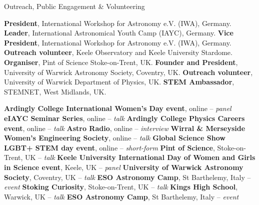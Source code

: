 \begin{rubric}{Outreach, Public Engagement \& Volunteering }

\entry*[2023 -- 2024]%
    \textbf{President}, International Workshop for Astronomy e.V. (IWA), Germany.
\entry*[2017 -- 2024]%
    \textbf{Leader}, International Astronomical Youth Camp (IAYC), Germany. 
\entry*[2021 -- 2023]%
    \textbf{Vice President}, International Workshop for Astronomy e.V. (IWA), Germany. 
\entry*[2019 -- 2022]%
    \textbf{Outreach volunteer}, Keele Observatory and Keele University Stardome.
\entry*[2019 -- 2020]%
    \textbf{Organiser}, Pint of Science Stoke-on-Trent, UK.
\entry*[2016 -- 2018]%
    \textbf{Founder and President}, University of Warwick Astronomy Society, Coventry, UK.
\entry*[2017 -- 2018]%
    \textbf{Outreach volunteer}, University of Warwick Department of Physics, UK. 
\entry*[2016 -- 2018]%
    \textbf{STEM Ambassador}, STEMNET, West Midlands, UK.

\entry*[2022]%
    \textbf{Ardingly College International Women's Day event}, online -- \textit{panel}
\entry*[2021]%
    \textbf{eIAYC Seminar Series}, online -- \textit{talk}
\entry*[2021]%
    \textbf{Ardingly College Physics Careers event}, online -- \textit{talk}
\entry*[2021]%
    \textbf{Astro Radio}, online -- \textit{interview}
\entry*[2020]%
    \textbf{Wirral \& Merseyside Women's Engineering Society}, online -- \textit{talk}  
\entry*[2020]%
    \textbf{Global Science Show LGBT+ STEM day event}, online -- \textit{short-form}  
\entry*[2019]%
    \textbf{Pint of Science}, Stoke-on-Trent, UK -- \textit{talk} 
\entry*[2019]%
    \textbf{Keele University International Day of Women and Girls in Science event}, Keele, UK -- \textit{panel} 
\entry*[2019]%
    \textbf{University of Warwick Astronomy Society}, Coventry, UK -- \textit{talk} 
\entry*[2018]%
    \textbf{ESO Astronomy Camp}, St Barthelemy, Italy -- \textit{event}
\entry*[2018]%
    \textbf{Stoking Curiosity}, Stoke-on-Trent, UK -- \textit{talk}
\entry*[2018]%
    \textbf{Kings High School}, Warwick, UK -- \textit{talk} 
\entry*[2017]%
    \textbf{ESO Astronomy Camp}, St Barthelemy, Italy -- \textit{event}
    
\end{rubric}